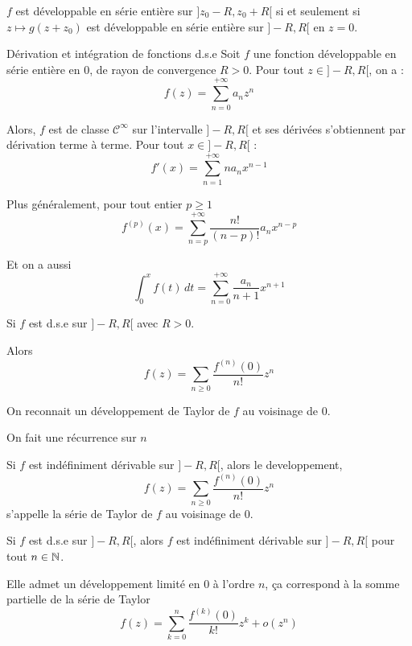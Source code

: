 \documentclass[a4paper,12pt]{article}
\begin{document}
\begin{proposition}{}{}
    $f$ est développable en série entière sur $]z_0 - R, z_0 + R[$ si et seulement si
    $z \mapsto g(z + z_0)$ est développable en série entière sur $]-R, R[$ en $z = 0$.
\end{proposition}

\begin{theoreme}{Dérivation et intégration de fonctions d.s.e}{}
    Soit $f$ une fonction développable en série entière en 0, de rayon de convergence $R > 0$. 
    Pour tout $z \in ]-R, R[$, on a : 
    $$
    f(z) = \sum_{n=0}^{+\infty} a_n z^n
    $$

    Alors, $f$ est de classe $\mathcal{C}^\infty$ sur l'intervalle $]-R, R[$ et ses dérivées s'obtiennent par dérivation terme à terme. Pour tout $x \in ]-R, R[$ :
    $$
    f'(x) = \sum_{n=1}^{+\infty} n a_n x^{n-1}
    $$

    Plus généralement, pour tout entier $p \geq 1$
    $$
    f^{(p)}(x) = \sum_{n=p}^{+\infty} \frac{n!}{(n-p)!} a_n x^{n-p}
    $$

    Et on a aussi
    $$
    \int_0^x f(t) \,dt = \sum_{n=0}^{+\infty} \frac{a_n}{n + 1} x^{n + 1}
    $$
\end{theoreme}

\begin{corollaire}{}{}
    Si $f$ est d.s.e sur $]-R, R[$ avec $R > 0$.

    Alors
    $$
    f(z) = \sum_{n \geq 0} \dfrac{f^{(n)}(0)}{n!} z^n
    $$
\end{corollaire}

\begin{remarque}
    On reconnait un développement de Taylor de $f$ au voisinage de 0.
\end{remarque}

\begin{demonstration}
    On fait une récurrence sur $n$
\end{demonstration}

\begin{definition}
    Si $f$ est indéfiniment dérivable sur $]-R, R[$, alors le developpement,
    $$
    f(z) = \sum_{n \geq 0} \dfrac{f^{(n)}(0)}{n!} z^n
    $$
    s'appelle la série de Taylor de $f$ au voisinage de 0.
\end{definition}

\begin{proposition}{}{}
    Si $f$ est d.s.e sur $]-R, R[$, alors $f$ est indéfiniment dérivable sur $]-R, R[$ pour tout $n \in \mathbb{N}$.

    Elle admet un développement limité en 0 à l'ordre $n$, ça correspond à la somme partielle de la série de Taylor
    $$
    f(z) = \sum_{k = 0}^n \dfrac{f^{(k)}(0)}{k!} z^k + o(z^n)
    $$
\end{proposition}
\end{document}
